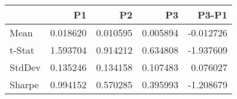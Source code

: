 \begin{tabular}{lrrrr}
\toprule
 & P1 & P2 & P3 & P3-P1 \\
\midrule
Mean & 0.018620 & 0.010595 & 0.005894 & -0.012726 \\
t-Stat & 1.593704 & 0.914212 & 0.634808 & -1.937609 \\
StdDev & 0.135246 & 0.134158 & 0.107483 & 0.076027 \\
Sharpe & 0.994152 & 0.570285 & 0.395993 & -1.208679 \\
\bottomrule
\end{tabular}
